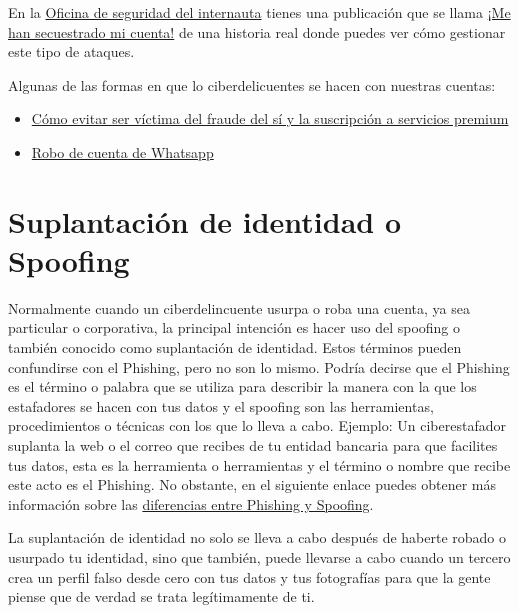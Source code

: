 \documentclass[
  a4paper,
  openany]{book}
\begin{document}
En la \href{https://www.osi.es/es}{Oficina de seguridad del internauta} tienes una publicación que se llama \href{https://www.osi.es/es/actualidad/historias-reales/2021/03/05/me-han-secuestrado-mi-cuenta}{¡Me han secuestrado mi cuenta!} de una historia real donde puedes ver cómo gestionar este tipo de ataques.

Algunas de las formas en que lo ciberdelicuentes se hacen con nuestras cuentas:

\begin{itemize}
\item
  \href{https://www.incibe.es/linea-de-ayuda-en-ciberseguridad/casos-reales/como-evitar-ser-victima-del-fraude-del-si-y-la-suscripcion-servicios-premium}{Cómo evitar ser víctima del fraude del sí y la suscripción a servicios premium}
\item
  \href{https://twitter.com/RavePrivacy/status/1754584579002830975?t=FD4dA9kbzOCHB39-6-86Eg\&s=09}{Robo de cuenta de Whatsapp}
\end{itemize}

\hypertarget{suplantaciuxf3n-de-identidad-o-spoofing}{%
\section{Suplantación de identidad o Spoofing}\label{suplantaciuxf3n-de-identidad-o-spoofing}}

Normalmente cuando un ciberdelincuente usurpa o roba una cuenta, ya sea particular o corporativa, la principal intención es hacer uso del spoofing o también conocido como suplantación de identidad. Estos términos pueden confundirse con el Phishing, pero no son lo mismo. Podría decirse que el Phishing es el término o palabra que se utiliza para describir la manera con la que los estafadores se hacen con tus datos y el spoofing son las herramientas, procedimientos o técnicas con los que lo lleva a cabo. Ejemplo: Un ciberestafador suplanta la web o el correo que recibes de tu entidad bancaria para que facilites tus datos, esta es la herramienta o herramientas y el término o nombre que recibe este acto es el Phishing. No obstante, en el siguiente enlace puedes obtener más información sobre las \href{https://techlandia.com/diferencia-phishing-spoofing-info_241711/}{diferencias entre Phishing y Spoofing}.

La suplantación de identidad no solo se lleva a cabo después de haberte robado o usurpado tu identidad, sino que también, puede llevarse a cabo cuando un tercero crea un perfil falso desde cero con tus datos y tus fotografías para que la gente piense que de verdad se trata legítimamente de ti.
\end{document}
